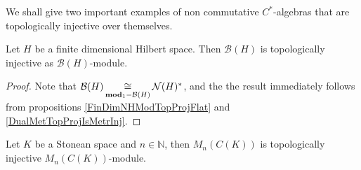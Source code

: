 We shall give two important examples of non commutative $C^*$-algebras that are topologically injective over themselves.

\begin{proposition}\label{FinDimBHModTopInj} Let $H$ be a finite dimensional Hilbert space. Then $\mathcal{B}(H)$ is topologically injective as $\mathcal{B}(H)$-module. 
\end{proposition}
\begin{proof} Note that $\mathcal{B}(H)\mathop{\mathbin{\cong}}\limits_{\mathbf{mod}_1-\mathcal{B}(H)}\mathcal{N}(H)^*$, and the the result immediately follows from propositions \ref{FinDimNHModTopProjFlat} and \ref{DualMetTopProjIsMetrInj}.
\end{proof}

\begin{proposition}\label{CKMatrixModTopInj} Let $K$ be a Stonean space and $n\in\mathbb{N}$, then $M_n(C(K))$ is topologically injective $M_n(C(K))$-module.
\end{proposition}
